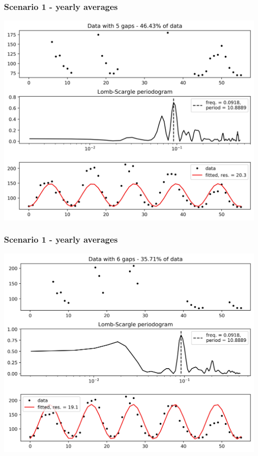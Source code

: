 \documentclass{beamer}
\begin{document}
\begin{frame}
\frametitle{Scenario 1 - yearly averages}
\begin{center}
\includegraphics[scale=0.55]{../scripts/dataset3/periodograms_ny2.0_model2_Ng5.jpg}
\end{center}
\end{frame}
\begin{frame}
\frametitle{Scenario 1 - yearly averages}
\begin{center}
\includegraphics[scale=0.55]{../scripts/dataset3/periodograms_ny2.0_model2_Ng6.jpg}
\end{center}
\end{frame}
\end{document}
